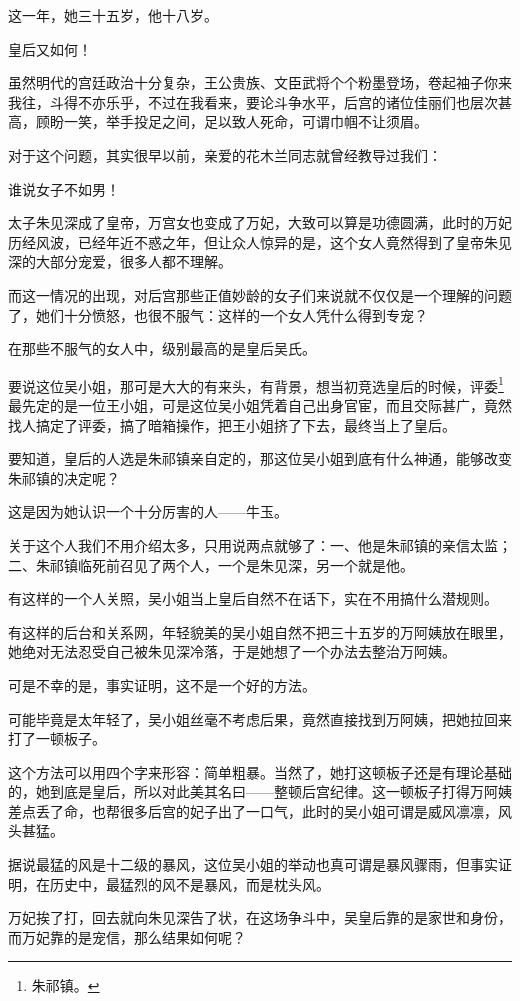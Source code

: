 \begin{multicols}{\theparacolNo}
这一年，她三十五岁，他十八岁。

皇后又如何！

虽然明代的宫廷政治十分复杂，王公贵族、文臣武将个个粉墨登场，卷起袖子你来我往，斗得不亦乐乎，不过在我看来，要论斗争水平，后宫的诸位佳丽们也层次甚高，顾盼一笑，举手投足之间，足以致人死命，可谓巾帼不让须眉。

对于这个问题，其实很早以前，亲爱的花木兰同志就曾经教导过我们：

谁说女子不如男！

太子朱见深成了皇帝，万宫女也变成了万妃，大致可以算是功德圆满，此时的万妃历经风波，已经年近不惑之年，但让众人惊异的是，这个女人竟然得到了皇帝朱见深的大部分宠爱，很多人都不理解。

而这一情况的出现，对后宫那些正值妙龄的女子们来说就不仅仅是一个理解的问题了，她们十分愤怒，也很不服气：这样的一个女人凭什么得到专宠？

在那些不服气的女人中，级别最高的是皇后吴氏。

要说这位吴小姐，那可是大大的有来头，有背景，想当初竞选皇后的时候，评委\footnote{朱祁镇。}最先定的是一位王小姐，可是这位吴小姐凭着自己出身官宦，而且交际甚广，竟然找人搞定了评委，搞了暗箱操作，把王小姐挤了下去，最终当上了皇后。

要知道，皇后的人选是朱祁镇亲自定的，那这位吴小姐到底有什么神通，能够改变朱祁镇的决定呢？

这是因为她认识一个十分厉害的人——牛玉。

关于这个人我们不用介绍太多，只用说两点就够了：一、他是朱祁镇的亲信太监；二、朱祁镇临死前召见了两个人，一个是朱见深，另一个就是他。

有这样的一个人关照，吴小姐当上皇后自然不在话下，实在不用搞什么潜规则。

有这样的后台和关系网，年轻貌美的吴小姐自然不把三十五岁的万阿姨放在眼里，她绝对无法忍受自己被朱见深冷落，于是她想了一个办法去整治万阿姨。

可是不幸的是，事实证明，这不是一个好的方法。

可能毕竟是太年轻了，吴小姐丝毫不考虑后果，竟然直接找到万阿姨，把她拉回来打了一顿板子。

这个方法可以用四个字来形容：简单粗暴。当然了，她打这顿板子还是有理论基础的，她到底是皇后，所以对此美其名曰——整顿后宫纪律。这一顿板子打得万阿姨差点丢了命，也帮很多后宫的妃子出了一口气，此时的吴小姐可谓是威风凛凛，风头甚猛。

据说最猛的风是十二级的暴风，这位吴小姐的举动也真可谓是暴风骤雨，但事实证明，在历史中，最猛烈的风不是暴风，而是枕头风。

万妃挨了打，回去就向朱见深告了状，在这场争斗中，吴皇后靠的是家世和身份，而万妃靠的是宠信，那么结果如何呢？


\end{multicols}
